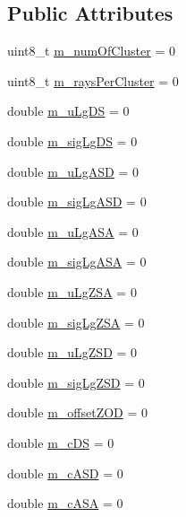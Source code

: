 \subsection*{Public Attributes}
\begin{DoxyCompactItemize}
\item 
uint8\+\_\+t \hyperlink{structns3_1_1ParamsTable_ad6857120c0e337f2b70ddb1220e056a1}{m\+\_\+num\+Of\+Cluster} = 0
\item 
uint8\+\_\+t \hyperlink{structns3_1_1ParamsTable_a45f11bf78732c417a8c33cf11e887a90}{m\+\_\+rays\+Per\+Cluster} = 0
\item 
double \hyperlink{structns3_1_1ParamsTable_a3030eaa717d9e9a95a794275eea84315}{m\+\_\+u\+Lg\+DS} = 0
\item 
double \hyperlink{structns3_1_1ParamsTable_a3160d639fe7b7ffd4251fa84a3ad5538}{m\+\_\+sig\+Lg\+DS} = 0
\item 
double \hyperlink{structns3_1_1ParamsTable_a3a934456a3f01f37f95e05e9cbb8b0ec}{m\+\_\+u\+Lg\+A\+SD} = 0
\item 
double \hyperlink{structns3_1_1ParamsTable_a4ab3fb6632950b1227ca5b099015439b}{m\+\_\+sig\+Lg\+A\+SD} = 0
\item 
double \hyperlink{structns3_1_1ParamsTable_ab1c95658524a112d994747b0d4868267}{m\+\_\+u\+Lg\+A\+SA} = 0
\item 
double \hyperlink{structns3_1_1ParamsTable_afed489b323efb00d9bdd0f85c9dffa2f}{m\+\_\+sig\+Lg\+A\+SA} = 0
\item 
double \hyperlink{structns3_1_1ParamsTable_ad4d908238af248378b5118ee4b73a83a}{m\+\_\+u\+Lg\+Z\+SA} = 0
\item 
double \hyperlink{structns3_1_1ParamsTable_a39d8bc22ece7d8c1cf9cf338f38784d6}{m\+\_\+sig\+Lg\+Z\+SA} = 0
\item 
double \hyperlink{structns3_1_1ParamsTable_aae35745f216dbbd1ea226b542ab0d944}{m\+\_\+u\+Lg\+Z\+SD} = 0
\item 
double \hyperlink{structns3_1_1ParamsTable_aeb4aca1e62558a55afaa23f22bdc496c}{m\+\_\+sig\+Lg\+Z\+SD} = 0
\item 
double \hyperlink{structns3_1_1ParamsTable_a4104ad3bbe3898d4dfc05de29bb5fa31}{m\+\_\+offset\+Z\+OD} = 0
\item 
double \hyperlink{structns3_1_1ParamsTable_afaf471e810a6d0b40dba8d682eae6f41}{m\+\_\+c\+DS} = 0
\item 
double \hyperlink{structns3_1_1ParamsTable_a0f9954987c6a0999ee1d95ec016a80dc}{m\+\_\+c\+A\+SD} = 0
\item 
double \hyperlink{structns3_1_1ParamsTable_aad00f3c11dec9ab5b6d5e670926afe32}{m\+\_\+c\+A\+SA} = 0

\end{DoxyCompactItemize}
